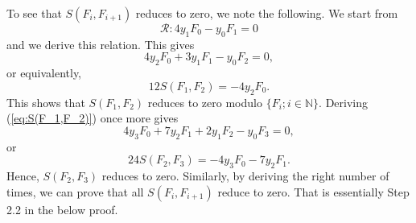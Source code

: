 To see that $S(F_i,F_{i+1})$ reduces to zero, we note the following. We start from 
\begin{equation*}
 \mathcal{R} : 4y_1F_0 - y_0F_1 = 0
\end{equation*}
and we derive this relation. This gives
\begin{equation}\label{eq:S(F_1,F_2)}
 4y_2F_0 + 3y_1F_1 - y_0F_2 = 0,
 \end{equation}
or equivalently,
\[ 12 S(F_1,F_2) = -4y_2F_0. \]
This shows that $S(F_1,F_2)$ reduces to zero modulo $\{F_i; i\in \mathbb{N}\}$. Deriving (\ref{eq:S(F_1,F_2)}) once more gives
 \[ 4y_3F_0 + 7y_2F_1 + 2y_1F_2 - y_0F_3 = 0,\]
or
\[ 24S(F_2,F_3) = - 4y_3F_0 - 7y_2F_1.  \]
Hence, $S(F_2,F_3)$ reduces to zero. Similarly, by deriving the right number of times, we can prove that all $S(F_i,F_{i+1})$ reduce to zero. That is essentially Step 2.2 in the below proof.

